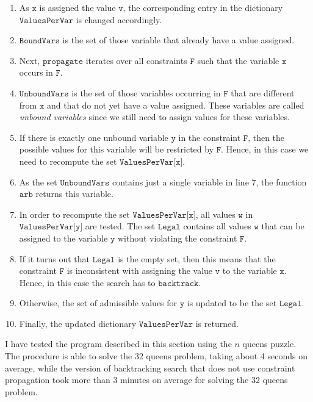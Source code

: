 \begin{enumerate}
\item As $\texttt{x}$ is assigned the value $\texttt{v}$, the corresponding entry in the dictionary
      $\texttt{ValuesPerVar}$ is changed accordingly. 
\item $\texttt{BoundVars}$ is the set of those variable that already have a value assigned.
\item Next, $\texttt{propagate}$ iterates over all  constraints $\texttt{F}$ such that the variable
      $\texttt{x}$ occurs in $\texttt{F}$.
\item $\texttt{UnboundVars}$ is the set of those variables occurring in $\texttt{F}$ that are different from
      $\texttt{x}$ and that do not yet have a value assigned.  These variables are called \emph{unbound variables} 
      since we still need to assign values for these variables.
\item If there is exactly one unbound variable $\texttt{y}$ in the constraint $\texttt{F}$, then the possible values for this
      variable will be restricted by $\texttt{F}$.  Hence, in this case we need to recompute the set
      $\texttt{ValuesPerVar[x]}$.
\item As the set $\texttt{UnboundVars}$ contains just a single variable in line 7,
      the function $\texttt{arb}$ returns this variable.
\item In order to recompute the set $\texttt{ValuesPerVar[x]}$,  all values $\texttt{w}$ in
      $\texttt{ValuesPerVar[y]}$ are tested.  The set $\texttt{Legal}$ contains all values $\texttt{w}$ that can
      be assigned to the variable $\texttt{y}$ without violating the constraint $\texttt{F}$.
\item If it turns out that $\texttt{Legal}$ is the empty set, then this means that the constraint
      $\texttt{F}$ is inconsistent with assigning the value $\texttt{v}$ to the variable
      $\texttt{x}$.  Hence, in this case the  search has to  $\texttt{backtrack}$.
\item Otherwise, the set of admissible values for $\texttt{y}$ is updated to be the set $\texttt{Legal}$.
\item Finally, the updated dictionary $\mathtt{ValuesPerVar}$ is returned.
\end{enumerate}
I have tested the program described in this section using the $n$ queens puzzle. 
The procedure is able to solve the 32 queens problem, taking about 4 seconds on average, while the version
of backtracking search that does not use constraint propagation took more than 3 minutes on average for solving
the 32 queens problem.

